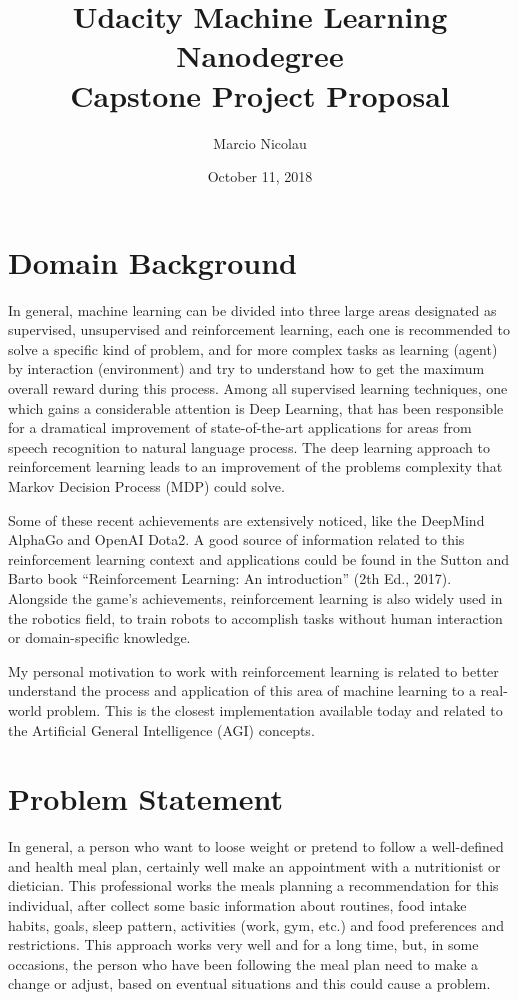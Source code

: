 \documentclass{article}
\title{Udacity Machine Learning Nanodegree \\ Capstone Project Proposal}
\author{Marcio Nicolau}
\date{October 11, 2018}
\begin{document}
\maketitle

\section{Domain Background}

In general, machine learning can be divided into three large areas designated as supervised, 
unsupervised and reinforcement learning, each one is recommended to solve a specific kind of problem, 
and for more complex tasks as learning (agent) by interaction (environment) and try to understand how 
to get the maximum overall reward during this process. Among all supervised learning techniques, one which 
gains a considerable attention is Deep Learning, that has been responsible for a dramatical improvement 
of state-of-the-art applications for areas from speech recognition to natural language process. 
The deep learning approach to reinforcement learning leads to an improvement of the problems complexity 
that Markov Decision Process (MDP) could solve.

Some of these recent achievements are extensively noticed, like the DeepMind AlphaGo and OpenAI Dota2. 
A good source of information related to this reinforcement learning context and applications could be 
found in the Sutton and Barto book ``Reinforcement Learning: An introduction'' (2th Ed., 2017). 
Alongside the game’s achievements, reinforcement learning is also widely used in the robotics field, 
to train robots to accomplish tasks without human interaction or domain-specific knowledge.

My personal motivation to work with reinforcement learning is related to better understand the 
process and application of this area of machine learning to a real-world problem. This is the 
closest implementation available today and related to the Artificial General Intelligence (AGI) concepts.

\section{Problem Statement}

In general, a person who want to loose weight or pretend to follow a well-defined and health meal plan, 
certainly well make an appointment with a nutritionist or dietician. This professional works the 
meals planning a recommendation for this individual, after collect some basic information about 
routines, food intake habits, goals, sleep pattern, activities (work, gym, etc.) and food 
preferences and restrictions. This approach works very well and for a long time, but, in some occasions, 
the person who have been following the meal plan need to make a change or adjust, based on eventual 
situations and this could cause a problem.
\end{document}
